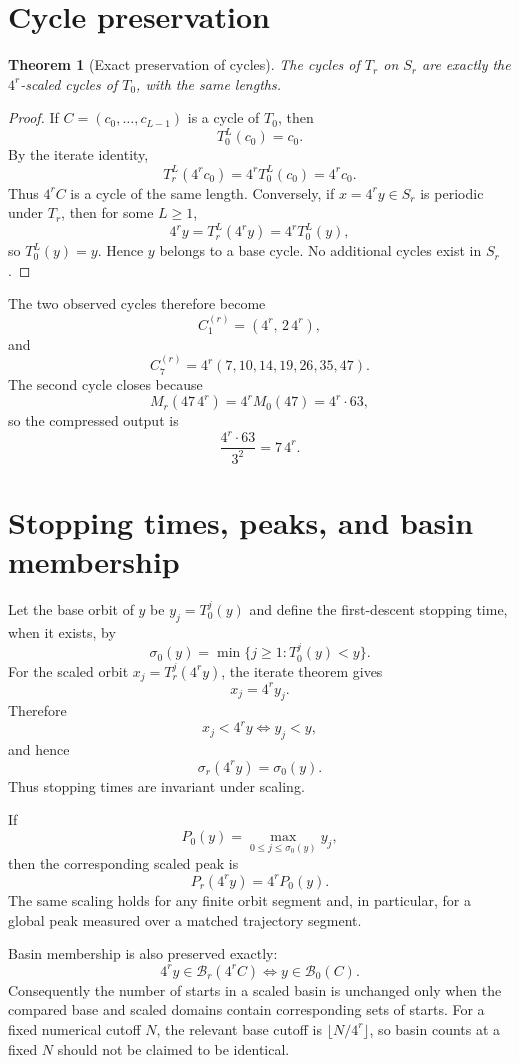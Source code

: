 \documentclass[11pt]{article}
\newtheorem{theorem}[definition]{Theorem}
\begin{document}
\section{Cycle preservation}
\begin{theorem}[Exact preservation of cycles]
The cycles of $T_r$ on $S_r$ are exactly the $4^r$-scaled cycles of $T_0$, with the same lengths.
\end{theorem}
\begin{proof}
If $C=(c_0,\ldots,c_{L-1})$ is a cycle of $T_0$, then
\[
T_0^L(c_0)=c_0.
\]
By the iterate identity,
\[
T_r^L(4^rc_0)=4^rT_0^L(c_0)=4^rc_0.
\]
Thus $4^rC$ is a cycle of the same length. Conversely, if $x=4^ry\in S_r$ is periodic under $T_r$, then for some $L\ge1$,
\[
4^ry=T_r^L(4^ry)=4^rT_0^L(y),
\]
so $T_0^L(y)=y$. Hence $y$ belongs to a base cycle. No additional cycles exist in $S_r$.
\end{proof}

The two observed cycles therefore become
\[
C_1^{(r)}=(4^r,\,2\,4^r),
\]
and
\[
C_7^{(r)}=4^r(7,10,14,19,26,35,47).
\]
The second cycle closes because
\[
M_r(47\,4^r)=4^rM_0(47)=4^r\cdot63,
\]
so the compressed output is
\[
\frac{4^r\cdot63}{3^2}=7\,4^r.
\]

\section{Stopping times, peaks, and basin membership}
Let the base orbit of $y$ be $y_j=T_0^j(y)$ and define the first-descent stopping time, when it exists, by
\[
\sigma_0(y)=\min\{j\ge1:T_0^j(y)<y\}.
\]
For the scaled orbit $x_j=T_r^j(4^ry)$, the iterate theorem gives
\[
x_j=4^ry_j.
\]
Therefore
\[
x_j<4^ry\iff y_j<y,
\]
and hence
\[
\sigma_r(4^ry)=\sigma_0(y).
\]
Thus stopping times are invariant under scaling.

If
\[
P_0(y)=\max_{0\le j\le\sigma_0(y)}y_j,
\]
then the corresponding scaled peak is
\[
P_r(4^ry)=4^rP_0(y).
\]
The same scaling holds for any finite orbit segment and, in particular, for a global peak measured over a matched trajectory segment.

Basin membership is also preserved exactly:
\[
4^ry\in\mathcal B_r(4^rC)\iff y\in\mathcal B_0(C).
\]
Consequently the number of starts in a scaled basin is unchanged only when the compared base and scaled domains contain corresponding sets of starts. For a fixed numerical cutoff $N$, the relevant base cutoff is $\lfloor N/4^r\rfloor$, so basin counts at a fixed $N$ should not be claimed to be identical.
\end{document}
